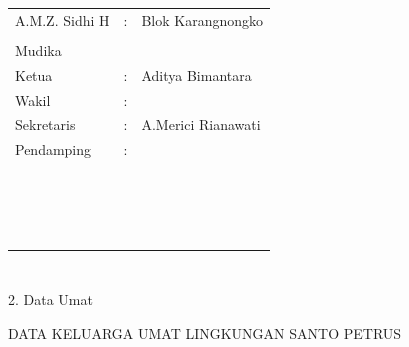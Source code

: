 \documentclass{article}
\begin{document}
\begin{flushleft}
\begin{supertabular}{m{4.1200004cm}m{0.15299998cm}m{8.621cm}}
A.M.Z. Sidhi H &
\centering : &
Blok Karangnongko\\
 &
 &
\\
Mudika &
 &
\\
Ketua &
\centering : &
Aditya Bimantara\\
Wakil &
\centering : &
\\
Sekretaris &
\centering : &
A.Merici Rianawati\\
Pendamping &
\centering : &
\\
 &
 &
\\
 &
 &
\\
 &
 &
\\
 &
 &
\\
 &
 &
\\
~ &
 &
\\
 &
 &
\\
 &
 &
\\
~ &
 &
\\
\end{supertabular}
\end{flushleft}
\section[]{}
2. Data Umat

DATA KELUARGA UMAT LINGKUNGAN SANTO PETRUS~
\end{document}
